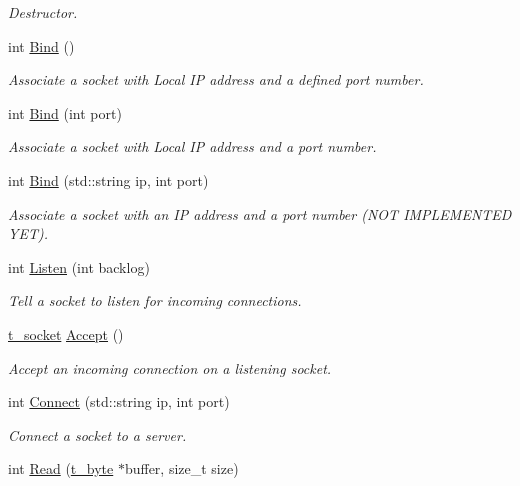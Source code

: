 \begin{DoxyCompactItemize}
\begin{DoxyCompactList}\small\item\em Destructor. \end{DoxyCompactList}\item 
int \hyperlink{classSocket_a4fcdcae06c85a6a4be83cee0f9c34735}{Bind} ()
\begin{DoxyCompactList}\small\item\em Associate a socket with Local I\+P address and a defined port number. \end{DoxyCompactList}\item 
int \hyperlink{classSocket_a9a9ba7cf3d9efe0a8c502d8d589d7f48}{Bind} (int port)
\begin{DoxyCompactList}\small\item\em Associate a socket with Local I\+P address and a port number. \end{DoxyCompactList}\item 
int \hyperlink{classSocket_a43c2f57797c9e37de056f8e0dab2c1f1}{Bind} (std\+::string ip, int port)
\begin{DoxyCompactList}\small\item\em Associate a socket with an I\+P address and a port number (N\+O\+T I\+M\+P\+L\+E\+M\+E\+N\+T\+E\+D Y\+E\+T). \end{DoxyCompactList}\item 
int \hyperlink{classSocket_a41051323db81b63a66ac66321962edca}{Listen} (int backlog)
\begin{DoxyCompactList}\small\item\em Tell a socket to listen for incoming connections. \end{DoxyCompactList}\item 
\hyperlink{util_8h_a3a5c9c6e94e7c0d53da206ce360ea0f2}{t\+\_\+socket} \hyperlink{classSocket_a1a8d2862dd66d6345e72705d30f36406}{Accept} ()
\begin{DoxyCompactList}\small\item\em Accept an incoming connection on a listening socket. \end{DoxyCompactList}\item 
int \hyperlink{classSocket_af29e2918a65dc095a4d29f3f737d1c65}{Connect} (std\+::string ip, int port)
\begin{DoxyCompactList}\small\item\em Connect a socket to a server. \end{DoxyCompactList}\item 
int \hyperlink{classSocket_ac2c3da9186d42f261286e75161a7a3e9}{Read} (\hyperlink{util_8h_af1d862c52e0c84cc223f106956ac8543}{t\+\_\+byte} $\ast$buffer, size\+\_\+t size)

\end{DoxyCompactItemize}
